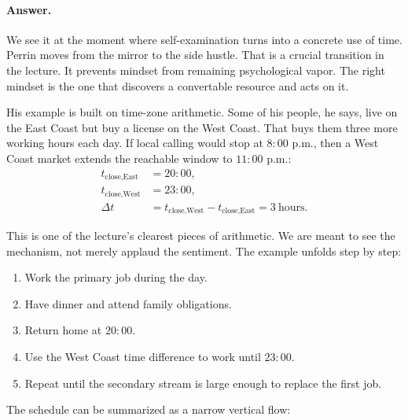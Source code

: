 \paragraph{Answer.} We see it at the moment where self-examination turns into a concrete use of time. Perrin moves from the mirror to the side hustle. That is a crucial transition in the lecture. It prevents mindset from remaining psychological vapor. The right mindset is the one that discovers a convertable resource and acts on it.

His example is built on time-zone arithmetic. Some of his people, he says, live on the East Coast but buy a license on the West Coast. That buys them three more working hours each day. If local calling would stop at \(8{:}00\) p.m., then a West Coast market extends the reachable window to \(11{:}00\) p.m.:
\begin{align}
t_{\text{close,East}} &= 20{:}00,\\
t_{\text{close,West}} &= 23{:}00,\\
\Delta t &= t_{\text{close,West}} - t_{\text{close,East}} = 3\ \text{hours}.
\end{align}

This is one of the lecture's clearest pieces of arithmetic. We are meant to see the mechanism, not merely applaud the sentiment. The example unfolds step by step:
\begin{enumerate}
\item Work the primary job during the day.
\item Have dinner and attend family obligations.
\item Return home at \(20{:}00\).
\item Use the West Coast time difference to work until \(23{:}00\).
\item Repeat until the secondary stream is large enough to replace the first job.
\end{enumerate}

The schedule can be summarized as a narrow vertical flow:

\begin{figure}[h]
\centering
{}
\end{figure}

